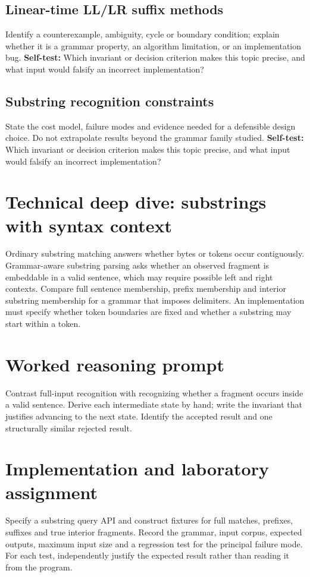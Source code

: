 \documentclass[11pt,letterpaper]{article}
\begin{document}
\subsection{Linear-time LL/LR suffix methods}
Identify a counterexample, ambiguity, cycle or boundary condition; explain whether it is a grammar property, an algorithm limitation, or an implementation bug.
\textbf{Self-test:} Which invariant or decision criterion makes this topic precise, and what input would falsify an incorrect implementation?
\subsection{Substring recognition constraints}
State the cost model, failure modes and evidence needed for a defensible design choice. Do not extrapolate results beyond the grammar family studied.
\textbf{Self-test:} Which invariant or decision criterion makes this topic precise, and what input would falsify an incorrect implementation?
\section{Technical deep dive: substrings with syntax context}
Ordinary substring matching answers whether bytes or tokens occur contiguously. Grammar-aware substring parsing asks whether an observed fragment is embeddable in a valid sentence, which may require possible left and right contexts. Compare full sentence membership, prefix membership and interior substring membership for a grammar that imposes delimiters. An implementation must specify whether token boundaries are fixed and whether a substring may start within a token.
\section{Worked reasoning prompt}
Contrast full-input recognition with recognizing whether a fragment occurs inside a valid sentence. Derive each intermediate state by hand; write the invariant that justifies advancing to the next state. Identify the accepted result and one structurally similar rejected result.
\section{Implementation and laboratory assignment}
Specify a substring query API and construct fixtures for full matches, prefixes, suffixes and true interior fragments. Record the grammar, input corpus, expected outputs, maximum input size and a regression test for the principal failure mode. For each test, independently justify the expected result rather than reading it from the program.
\end{document}
